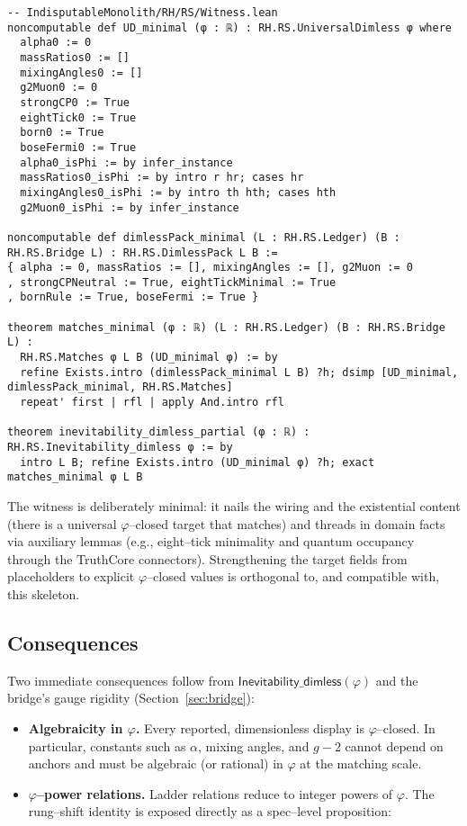 \documentclass[11pt,a4paper,twoside]{article}
\numberwithin{equation}{section}
\newcommand{\phigr}{\varphi} %
\theoremstyle{customthm}
\theoremstyle{customdef}
\theoremstyle{customrem}
\begin{document}
\begin{lstlisting}
-- IndisputableMonolith/RH/RS/Witness.lean
noncomputable def UD_minimal (φ : ℝ) : RH.RS.UniversalDimless φ where
  alpha0 := 0
  massRatios0 := []
  mixingAngles0 := []
  g2Muon0 := 0
  strongCP0 := True
  eightTick0 := True
  born0 := True
  boseFermi0 := True
  alpha0_isPhi := by infer_instance
  massRatios0_isPhi := by intro r hr; cases hr
  mixingAngles0_isPhi := by intro th hth; cases hth
  g2Muon0_isPhi := by infer_instance

noncomputable def dimlessPack_minimal (L : RH.RS.Ledger) (B : RH.RS.Bridge L) : RH.RS.DimlessPack L B :=
{ alpha := 0, massRatios := [], mixingAngles := [], g2Muon := 0
, strongCPNeutral := True, eightTickMinimal := True
, bornRule := True, boseFermi := True }

theorem matches_minimal (φ : ℝ) (L : RH.RS.Ledger) (B : RH.RS.Bridge L) :
  RH.RS.Matches φ L B (UD_minimal φ) := by
  refine Exists.intro (dimlessPack_minimal L B) ?h; dsimp [UD_minimal, dimlessPack_minimal, RH.RS.Matches]
  repeat' first | rfl | apply And.intro rfl

theorem inevitability_dimless_partial (φ : ℝ) : RH.RS.Inevitability_dimless φ := by
  intro L B; refine Exists.intro (UD_minimal φ) ?h; exact matches_minimal φ L B
\end{lstlisting}

\noindent The witness is deliberately minimal: it nails the wiring and the existential content (there is a universal $\phigr$–closed target that matches) and threads in domain facts via auxiliary lemmas (e.g., eight–tick minimality and quantum occupancy through the TruthCore connectors). Strengthening the target fields from placeholders to explicit $\phigr$–closed values is orthogonal to, and compatible with, this skeleton.

\subsection{Consequences}

Two immediate consequences follow from $\mathsf{Inevitability\_dimless}(\phigr)$ and the bridge's gauge rigidity (Section~\ref{sec:bridge}):

\begin{itemize}[leftmargin=*]
  \item \textbf{Algebraicity in $\phigr$.} Every reported, dimensionless display is $\phigr$–closed. In particular, constants such as $\alpha$, mixing angles, and $g-2$ cannot depend on anchors and must be algebraic (or rational) in $\phigr$ at the matching scale.
  \item \textbf{$\phigr$–power relations.} Ladder relations reduce to integer powers of $\phigr$. The rung–shift identity is exposed directly as a spec–level proposition:
\end{itemize}
\end{document}
